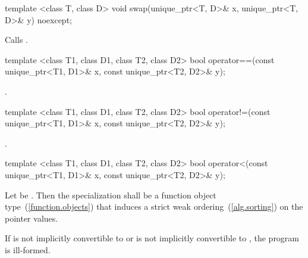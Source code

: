 \begin{itemdecl}
template <class T, class D> void swap(unique_ptr<T, D>& x, unique_ptr<T, D>& y) noexcept;
\end{itemdecl}

\begin{itemdescr}
\pnum
\effects Calls .
\end{itemdescr}

%
%
\begin{itemdecl}
template <class T1, class D1, class T2, class D2>
  bool operator==(const unique_ptr<T1, D1>& x, const unique_ptr<T2, D2>& y);
\end{itemdecl}

\begin{itemdescr}
\pnum
\returns {}.
\end{itemdescr}

%
%
\begin{itemdecl}
template <class T1, class D1, class T2, class D2>
  bool operator!=(const unique_ptr<T1, D1>& x, const unique_ptr<T2, D2>& y);
\end{itemdecl}

\begin{itemdescr}
\pnum
\returns {}.
\end{itemdescr}

%
%
\begin{itemdecl}
template <class T1, class D1, class T2, class D2>
  bool operator<(const unique_ptr<T1, D1>& x, const unique_ptr<T2, D2>& y);
\end{itemdecl}

\begin{itemdescr}
\pnum
\requires Let  be 
. Then the specialization
 shall be a function object type~(\ref{function.objects}) that
induces a strict weak ordering~(\ref{alg.sorting}) on the pointer values.

\pnum
\returns {}

\pnum
\remarks If  is not implicitly convertible
to  or  is not implicitly
convertible to , the program is ill-formed.
\end{itemdescr}

